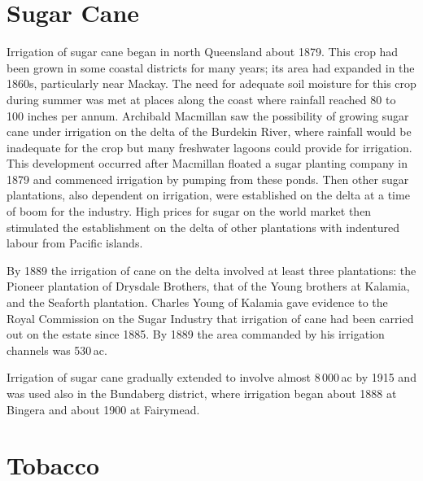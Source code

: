 \section*{Sugar Cane}

Irrigation of sugar cane began in north Queensland about 1879.  This
crop had been grown in some coastal districts for many years; its area
had expanded in the 1860s, particularly near Mackay.  The need for
adequate soil moisture for this crop during summer was met at places
along the coast where rainfall reached 80 to 100 inches per annum.
Archibald Macmillan saw the possibility of growing sugar cane under
irrigation on the delta of the Burdekin River, where rainfall would be
inadequate for the crop but many freshwater lagoons could provide for
irrigation.  This development occurred after Macmillan floated a sugar
planting company in 1879 and commenced irrigation by pumping from
these ponds.  Then other sugar plantations, also dependent on
irrigation, were established on the delta at a time of boom for the
industry.  High prices for sugar on the world market then stimulated
the establishment on the delta of other plantations with indentured
labour from Pacific islands.

By 1889 the irrigation of cane on the delta involved at least three
plantations: the Pioneer plantation of Drysdale Brothers, that of the
Young brothers at Kalamia, and the Seaforth plantation.  Charles Young
of Kalamia gave evidence to the Royal Commission on the Sugar Industry
that irrigation of cane had been carried out on the estate since
1885. By 1889 the area commanded by his irrigation channels was
530\,ac.

Irrigation of sugar cane gradually extended to involve almost
8\,000\,ac by 1915 and was used also in the Bundaberg district, where
irrigation began about 1888 at Bingera and about 1900 at
Fairymead.

\section*{Tobacco}

